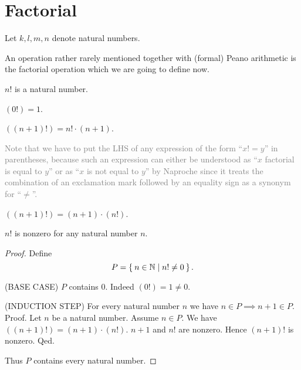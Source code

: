 \documentclass[../../arithmetic.tex]{subfiles}
\begin{document}
  \section{Factorial}

  \begin{forthel}
  \end{forthel}

  \begin{forthel}
    Let $k, l, m, n$ denote natural numbers.
  \end{forthel}

  \noindent An operation rather rarely mentioned together with (formal) Peano
  arithmetic is the factorial operation which we are going to define now.

  \begin{forthel}
    \begin{signature}
      $n!$ is a natural number.
    \end{signature}

    \begin{axiom}\label{Arithmetic_01_05_169222}
      $(0!) = 1$.
    \end{axiom}

    \begin{axiom}\label{Arithmetic_01_05_539010}
      $((n + 1)!) = n! \cdot (n + 1)$.
    \end{axiom}
  \end{forthel}

  \noindent \textcolor{gray}{Note that we have to put the LHS of any expression
  of the form \enquote{$x! = y$} in parentheses, because such an expression can
  either be understood as \enquote{$x$ factorial is equal to $y$} or as
  \enquote{$x$ is not equal to $y$} by Naproche since it treats the combination
  of an exclamation mark followed by an equality sign as a synonym for
  \enquote{$\neq$}.}

  \begin{forthel}
    \begin{lemma}\label{Arithmetic_01_05_692846}
      $((n + 1)!) = (n + 1) \cdot (n!)$.
    \end{lemma}

    \begin{proposition}\label{Arithmetic_01_05_473272}
      $n!$ is nonzero for any natural number $n$.
    \end{proposition}
    \begin{proof}
      Define \[ P = \Set{n \in \mathbb{N} | n! \neq 0}. \]

      (BASE CASE) $P$ contains $0$.
      Indeed $(0!) = 1 \neq 0$.

      (INDUCTION STEP) For every natural number $n$ we have $n \in P \implies n + 1 \in P$. \\
      Proof.
        Let $n$ be a natural number.
        Assume $n \in P$.
        We have $((n + 1)!) = (n + 1) \cdot (n!)$.
        $n + 1$ and $n!$ are nonzero.
        Hence $(n + 1)!$ is nonzero.
      Qed.

      Thus $P$ contains every natural number.
    \end{proof}
  \end{forthel}
\end{document}
